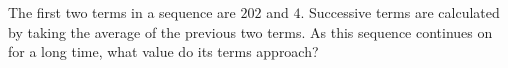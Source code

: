 The first two terms in a sequence are $202$ and $4$. Successive terms are calculated by taking the average of the previous two terms. As this sequence continues on for a long time, what value do its terms approach?

